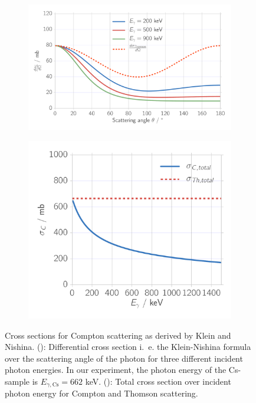 \newcommand{\picwidth}{0.48\textwidth}
\begin{figure}
    \begin{subfigure}[b]{\picwidth}
        \includegraphics[width=\linewidth]{analysis/figures/theory_diff_cs}
        \subcaption{$\,$}
        \label{fig:theory_diff_cs}
    \end{subfigure}\quad
    \begin{subfigure}[b]{\picwidth}
        \includegraphics[width=\linewidth]{analysis/figures/theory_total_cs}
        \subcaption{$\,$}
        \label{fig:theory_total_cs}
    \end{subfigure}
    \caption{Cross sections for Compton scattering as derived by Klein and Nishina. (): 
        Differential cross section i.~e. the Klein-Nishina formula over the scattering angle of the photon 
        for three different incident photon energies. In our experiment, the photon energy of the Cs-sample is 
        $E_{\gamma, \text{Cs}} = 662$ keV. (): Total cross section over incident photon 
        energy for Compton and Thomson scattering.
    }
    \label{fig:theory_cross_section}
\end{figure}


